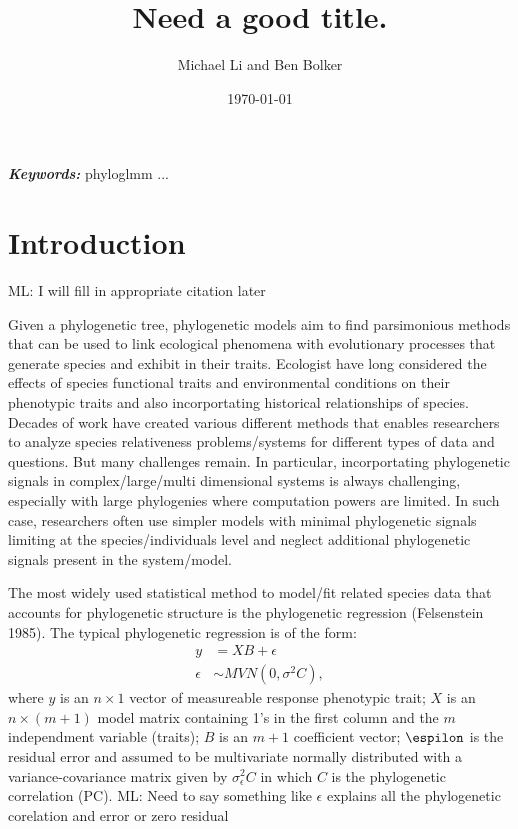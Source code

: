 \documentclass[12pt]{article}
\title{Need a good title.}
\author{Michael Li and Ben Bolker}
\date{\today}
\providecommand{\keywords}[1]{\textbf{\textit{Keywords:}} #1}
\begin{document}
\newcommand{\dbic}{\ensuremath \Delta \textrm{BIC}}

\newcommand{\bmbhide}[1]{}
\newcommand{\bmb}[1]{{\color{blue} BB: #1}}

\newcommand{\fref}[1]{Figure~\ref{fig:#1}}

\newcommand{\ml}[1]{{\color{red} ML: #1}}

\newcommand{\add}[1]{{\color{blue} ADD: #1}}

\maketitle

\doublespacing

\keywords{phyloglmm ... }

\section{Introduction}
\ml{I will fill in appropriate citation later}


Given a phylogenetic tree, phylogenetic models aim to find parsimonious methods that can be used to link ecological phenomena with evolutionary processes that generate species and exhibit in their traits.
Ecologist have long considered the effects of species functional traits and environmental conditions on their phenotypic traits and also incorportating historical relationships of species.
Decades of work have created various different methods that enables researchers to analyze species relativeness problems/systems for different types of data and questions.
But many challenges remain.
In particular, incorportating phylogenetic signals in complex/large/multi dimensional systems is always challenging, especially with large phylogenies where computation powers are limited.
In such case, researchers often use simpler models with minimal phylogenetic signals limiting at the species/individuals level and neglect additional phylogenetic signals present in the system/model.

The most widely used statistical method to model/fit related species data that accounts for phylogenetic structure is the phylogenetic regression (Felsenstein 1985).
The typical phylogenetic regression is of the form:
\begin{align}
y & = XB + \epsilon \\
\epsilon & \sim MVN(0,\sigma^{2}C),
\label{eq:gls}
\end{align}
where $y$ is an $n \times 1$ vector of measureable response phenotypic trait; $X$ is an $n \times (m + 1)$ model matrix containing 1's in the first column and the $m$ independment variable (traits); $B$ is an $m + 1$ coefficient vector; $\espilon$ is the residual error and assumed to be multivariate normally distributed with a variance-covariance matrix given by $\sigma^{2}_{ \epsilon} C$ in which $C$ is the phylogenetic correlation (PC).
\ml{Need to say something like $\epsilon$ explains all the phylogenetic corelation and error or zero residual}
\end{document}
